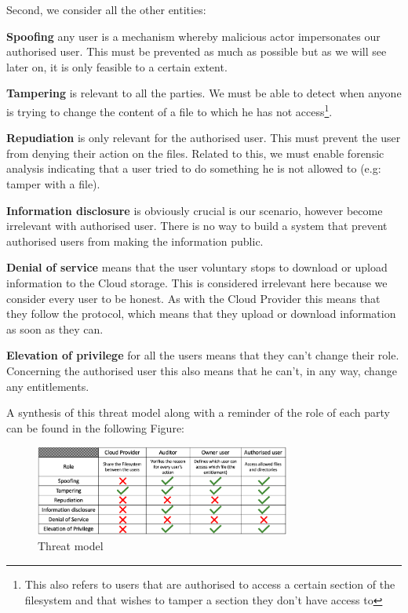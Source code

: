 \documentclass[../main.tex]{subfiles}
\begin{document}
\par Second, we consider all the other entities:
\par \textbf{Spoofing} any user is a mechanism whereby malicious actor impersonates our authorised user. This must be prevented as much as possible but as we will see later on, it is only feasible to a certain extent.
\par \textbf{Tampering} is relevant to all the parties. We must be able to detect when anyone is trying to change the content of a file to which he has not access\footnote{This also refers to users that are authorised to access a certain section of the filesystem and that wishes to tamper a section they don't have access to}.
\par \textbf{Repudiation} is only relevant for the authorised user. This must prevent the user from denying their action on the files. Related to this, we must enable forensic analysis indicating that a user tried to do something he is not allowed to (e.g: tamper with a file).
\par \textbf{Information disclosure} is obviously crucial is our scenario, however become irrelevant with authorised user. There is no way to build a system that prevent authorised users from making the information public.
\par \textbf{Denial of service} means that the user voluntary stops to download or upload information to the Cloud storage. This is considered irrelevant here because we consider every user to be honest. As with the Cloud Provider this means that they follow the protocol, which means that they upload or download information as soon as they can.
\par \textbf{Elevation of privilege} for all the users means that they can't change their role. Concerning the authorised user this also means that he can't, in any way, change any entitlements.\\

\par A synthesis of this threat model along with a reminder of the role of each party can be found in the following Figure:
\begin{figure}[h]
    \centering
    \includegraphics[width=0.75\textwidth]{images/problem/threat_model}
    
    \caption{Threat model}
    \label{figure:problem:threat_model}
\end{figure}
\end{document}
